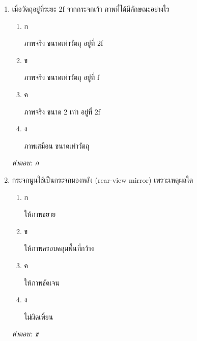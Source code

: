 \documentclass[12pt]{article}
\begin{document}
\begin{enumerate}[label=\arabic*., itemsep=0.5\baselineskip, topsep=0.5\baselineskip, leftmargin=*]
\item เมื่อวัตถุอยู่ที่ระยะ 2f จากกระจกเว้า ภาพที่ได้มีลักษณะอย่างไร
\begin{enumerate}[label=\alph*)., itemsep=0.3\baselineskip, topsep=0.3\baselineskip]
\item ก\ 
\begin{minipage}[t]{0.9\linewidth}
\raggedright ภาพจริง ขนาดเท่าวัตถุ อยู่ที่ 2f
\end{minipage}
\item ข\ 
\begin{minipage}[t]{0.9\linewidth}
\raggedright ภาพจริง ขนาดเท่าวัตถุ อยู่ที่ f
\end{minipage}
\item ค\ 
\begin{minipage}[t]{0.9\linewidth}
\raggedright ภาพจริง ขนาด 2 เท่า อยู่ที่ 2f
\end{minipage}
\item ง\ 
\begin{minipage}[t]{0.9\linewidth}
\raggedright ภาพเสมือน ขนาดเท่าวัตถุ
\end{minipage}
\end{enumerate}
\vspace{-0.3\baselineskip}
\begin{small}
\textit{คำตอบ: ก}
\end{small}

\item กระจกนูนใช้เป็นกระจกมองหลัง (rear-view mirror) เพราะเหตุผลใด
\begin{enumerate}[label=\alph*)., itemsep=0.3\baselineskip, topsep=0.3\baselineskip]
\item ก\ 
\begin{minipage}[t]{0.9\linewidth}
\raggedright ให้ภาพขยาย
\end{minipage}
\item ข\ 
\begin{minipage}[t]{0.9\linewidth}
\raggedright ให้ภาพครอบคลุมพื้นที่กว้าง
\end{minipage}
\item ค\ 
\begin{minipage}[t]{0.9\linewidth}
\raggedright ให้ภาพชัดเจน
\end{minipage}
\item ง\ 
\begin{minipage}[t]{0.9\linewidth}
\raggedright ไม่ผิดเพี้ยน
\end{minipage}
\end{enumerate}
\vspace{-0.3\baselineskip}
\begin{small}
\textit{คำตอบ: ข}
\end{small}


\end{enumerate}
\end{document}
